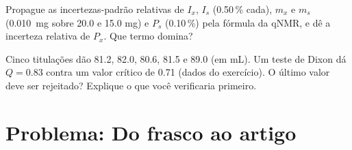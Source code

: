 \begin{exercise}[$\star\star\star$]\label{exo:b3:lab-techniques-3:11}
Propague as incertezas-padrão relativas de $I_x$, $I_s$ (0.50\,\% cada), $m_x$ e $m_s$ (\qty{0.010}{mg} sobre 20.0
e 15.0 mg) e $P_s$ (0.10\,\%) pela fórmula da qNMR, e dê a incerteza relativa de $P_x$.
Que termo domina?
\end{exercise}

\begin{exercise}[$\star\star\star$]\label{exo:b3:lab-techniques-3:12}
Cinco titulações dão 81.2, 82.0, 80.6, 81.5 e 89.0 (em mL). Um teste de Dixon dá
$Q = 0.83$ contra um valor crítico de 0.71 (dados do exercício). O último valor deve ser
rejeitado? Explique o que você verificaria primeiro.
\end{exercise}

\section{Problema: Do frasco ao artigo}

